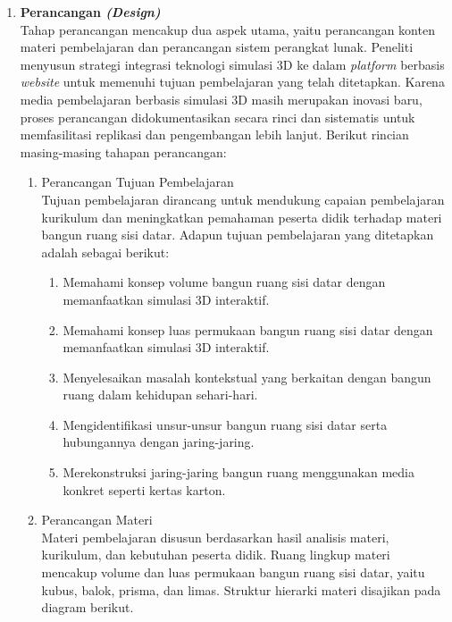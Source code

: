 \begin{enumerate}[leftmargin=1cm, label=\arabic*.]
    \item \textbf{Perancangan \textit{(Design)}}\\
    \hspace*{1cm}Tahap perancangan mencakup dua aspek utama, yaitu perancangan konten materi pembelajaran dan perancangan sistem perangkat lunak. Peneliti menyusun strategi integrasi teknologi simulasi 3D ke dalam \textit{platform} berbasis \textit{website} untuk memenuhi tujuan pembelajaran yang telah ditetapkan. Karena media pembelajaran berbasis simulasi 3D masih merupakan inovasi baru, proses perancangan didokumentasikan secara rinci dan sistematis untuk memfasilitasi replikasi dan pengembangan lebih lanjut. Berikut rincian masing-masing tahapan perancangan:
    \begin{enumerate}
        \item Perancangan Tujuan Pembelajaran \\
        \hspace*{1cm}Tujuan pembelajaran dirancang untuk mendukung capaian pembelajaran kurikulum dan meningkatkan pemahaman peserta didik terhadap materi bangun ruang sisi datar. Adapun tujuan pembelajaran yang ditetapkan adalah sebagai berikut:
        \begin{enumerate}
            \item Memahami konsep volume bangun ruang sisi datar dengan memanfaatkan simulasi 3D interaktif.
            \item Memahami konsep luas permukaan bangun ruang sisi datar dengan memanfaatkan simulasi 3D interaktif.
            \item Menyelesaikan masalah kontekstual yang berkaitan dengan bangun ruang dalam kehidupan sehari-hari.
            \item Mengidentifikasi unsur-unsur bangun ruang sisi datar serta hubungannya dengan jaring-jaring.
            \item Merekonstruksi jaring-jaring bangun ruang menggunakan media konkret seperti kertas karton.
        \end{enumerate}
        \item Perancangan Materi \\
        \hspace*{1cm}Materi pembelajaran disusun berdasarkan hasil analisis materi, kurikulum, dan kebutuhan peserta didik. Ruang lingkup materi mencakup volume dan luas permukaan bangun ruang sisi datar, yaitu kubus, balok, prisma, dan limas. Struktur hierarki materi disajikan pada diagram berikut.
        \begin{figure}[H]

\end{figure}
\end{enumerate}
\end{enumerate}
